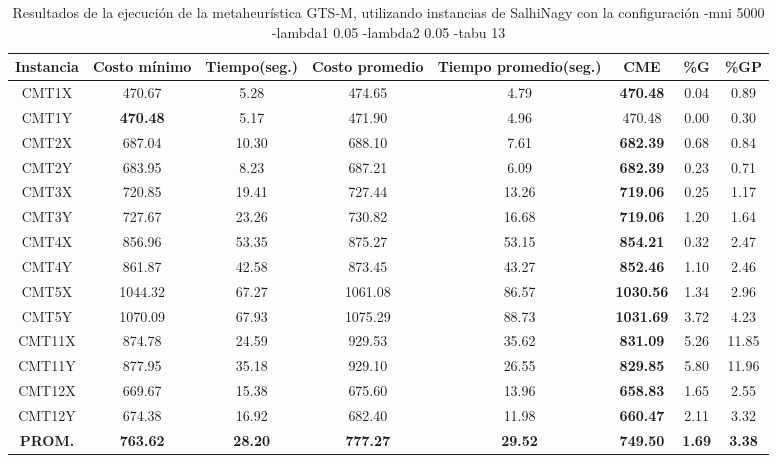 \begin{table}[h]
\caption{Resultados de la ejecución de la metaheurística GTS-M, utilizando instancias de SalhiNagy con la configuración -mni 5000 -lambda1 0.05 -lambda2 0.05 -tabu 13}
\centering
\small
\begin{tabular}{c c c c c c c c}
\hline\hline
Instancia & Costo mínimo & Tiempo(seg.) & Costo promedio & Tiempo promedio(seg.) & CME & \%G & \%GP \\ [0.5ex]
\hline
CMT1X & 470.67 & 5.28 & 
474.65 & 4.79 & \bf{470.48} & 
0.04 & 0.89\\CMT1Y & \bf{470.48} & 5.17 & 
471.90 & 4.96 & 470.48 & 0.00
 & 0.30\\CMT2X & 687.04 & 10.30 & 
688.10 & 7.61 & \bf{682.39} & 
0.68 & 0.84\\CMT2Y & 683.95 & 8.23 & 
687.21 & 6.09 & \bf{682.39} & 
0.23 & 0.71\\CMT3X & 720.85 & 19.41 & 
727.44 & 13.26 & \bf{719.06} & 
0.25 & 1.17\\CMT3Y & 727.67 & 23.26 & 
730.82 & 16.68 & \bf{719.06} & 
1.20 & 1.64\\CMT4X & 856.96 & 53.35 & 
875.27 & 53.15 & \bf{854.21} & 
0.32 & 2.47\\CMT4Y & 861.87 & 42.58 & 
873.45 & 43.27 & \bf{852.46} & 
1.10 & 2.46\\CMT5X & 1044.32 & 67.27 & 
1061.08 & 86.57 & \bf{1030.56} & 
1.34 & 2.96\\CMT5Y & 1070.09 & 67.93 & 
1075.29 & 88.73 & \bf{1031.69} & 
3.72 & 4.23\\CMT11X & 874.78 & 24.59 & 
929.53 & 35.62 & \bf{831.09} & 
5.26 & 11.85\\CMT11Y & 877.95 & 35.18 & 
929.10 & 26.55 & \bf{829.85} & 
5.80 & 11.96\\CMT12X & 669.67 & 15.38 & 
675.60 & 13.96 & \bf{658.83} & 
1.65 & 2.55\\CMT12Y & 674.38 & 16.92 & 
682.40 & 11.98 & \bf{660.47} & 
2.11 & 3.32\\\bf{PROM.} & 
\bf{763.62} & \bf{28.20} & \bf{777.27} & \bf{29.52} & \bf{749.50} & \bf{1.69} & \bf{3.38}\\[1ex]\hline
\end{tabular}
\label{table:nonlin}
\end{table}
